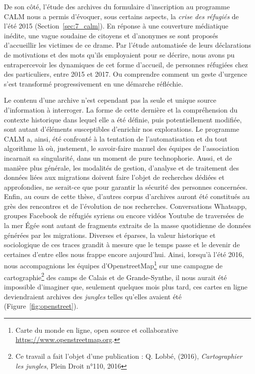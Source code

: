 \documentclass[symmetric,justified,marginals=raggedouter]{tufte-book}
\begin{document}
De son côté, l'étude des archives du formulaire d'inscrip\-tion au programme CALM nous a permis d'évoquer, sous certains aspects, la \textit{crise des réfugiés} de l'été 2015 (Section~\ref{sec:7_calm}). En réponse à une couverture médiatique inédite, une vague soudaine de citoyens et d'anonymes se sont proposés d'accueillir les victimes de ce drame. Par l'étude automatisée de leurs déclarations de motivations et des mots qu'ils employaient pour se décrire, nous avons pu entrapercevoir les dynamiques de cet forme d'accueil, de personnes réfugiées chez des particuliers, entre 2015 et 2017. Ou comprendre comment un geste d'urgence s'est transformé progressivement en une démarche réfléchie. 

Le contenu d'une archive n'est cependant pas la seule et unique source d'information à interroger. La forme de cette dernière et la compréhension du contexte historique dans lequel elle a été définie, puis potentiellement modifiée, sont autant d'éléments susceptibles d'enrichir nos explorations. Le programme CALM a, ainsi, été confronté à la tentation de l'automatisation et du tout algorithme là où, justement, le savoir-faire manuel des équipes de l'association incarnait sa singularité, dans un moment de pure technophorie. Aussi, et de manière plus générale, les modalités de gestion, d'analyse et de traitement des données liées aux migrations doivent faire l'objet de recherches dédiées et approfondies, ne serait-ce que pour garantir la sécurité des personnes concernées. \\

\noindent Enfin, au cours de cette thèse, d'autres corpus d'archives auront été constitués au grès des rencontres et de l'évolution de nos recherches. Conversations Whatsapp, groupes Facebook de réfugiés syriens ou encore vidéos Youtube de traversées de la mer Égée sont autant de fragments extraits de la masse quotidienne de données générées par les migrations. Diverses et éparses, la valeur historique et sociologique de ces traces grandit à mesure que le temps passe et le devenir de certaines d'entre elles nous frappe encore aujourd'hui. Ainsi, lorsqu'à l'été 2016, nous accompagnions les équipes d'OpenstreetMap\footnote{\RaggedOuter Carte du monde en ligne, open source et collaborative \url{https://www.openstreetmap.org}.} sur une campagne de cartographie\footnote{\RaggedOuter Ce travail a fait l'objet d'une publication : Q. Lobbé, (2016), \textit{Cartographier les jungles}, Plein Droit n°110, 2016} des camps de Calais et de Grande-Synthe, il nous aurait été impossible d'imaginer que, seulement quel\-ques mois plus tard, ces cartes en ligne deviendraient archives des \textit{jungles} telles qu'elles avaient été (Figure~\ref{fig:openstreet}). 
\end{document}
